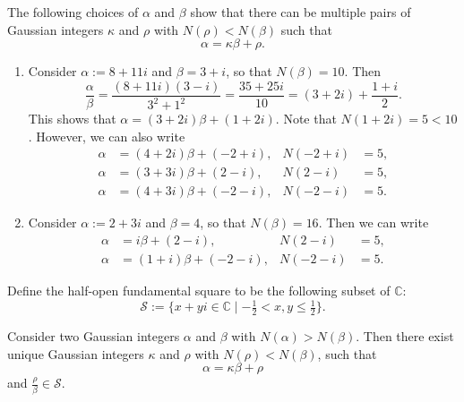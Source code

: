 \begin{example}
  The following choices of $\alpha$ and $\beta$ show that there can be multiple pairs of Gaussian integers $\kappa$ and $\rho$ with $N(\rho)<N(\beta)$ such that
  \begin{equation*}
    \alpha=\kappa\beta+\rho.
  \end{equation*}
  \begin{enumerate}
  \item Consider $\alpha := 8+11i$ and $\beta=3+i$, so that $N(\beta)=10$. Then
    \begin{equation*}
      \frac{\alpha}{\beta}=\frac{(8+11i)(3-i)}{3^2+1^2}=\frac{35+25i}{10}=(3+2i)+\frac{1+i}{2}.
    \end{equation*}
    This shows that $\alpha = (3+2i)\beta + (1+2i)$. Note that $N(1+2i)=5<10$. However, we can also write
    \begin{align*}
      \alpha & = (4+2i)\beta + (-2+i), & N(-2+i) & = 5,\\
      \alpha & = (3+3i)\beta + (2-i), & N(2-i) & = 5, \\
      \alpha & = (4+3i)\beta + (-2-i), & N(-2-i) & = 5.
    \end{align*}
  \item Consider $\alpha := 2+3i$ and $\beta=4$, so that $N(\beta)=16$. Then we can write
    \begin{align*}
      \alpha & = i\beta + (2-i), & N(2-i) & = 5, \\
      \alpha & = (1+i)\beta + (-2-i), & N(-2-i) & = 5.
    \end{align*}
  \end{enumerate}
\end{example}

Define the half-open fundamental square to be the following subset of $\mathbb{C}$:
\begin{equation*}
  \mathcal{S}:=\big\{x+yi\in\mathbb{C}\mid -\tfrac{1}{2}<x,y\leq \tfrac{1}{2}\big\}.
\end{equation*}

\begin{theorem}
  Consider two Gaussian integers $\alpha$ and $\beta$ with $N(\alpha)>N(\beta)$. Then there exist unique Gaussian integers $\kappa$ and $\rho$ with $N(\rho)<N(\beta)$, such that
  \begin{equation*}
    \alpha=\kappa\beta+\rho
  \end{equation*}
  and $\frac{\rho}{\beta}\in\mathcal{S}$.
\end{theorem}

